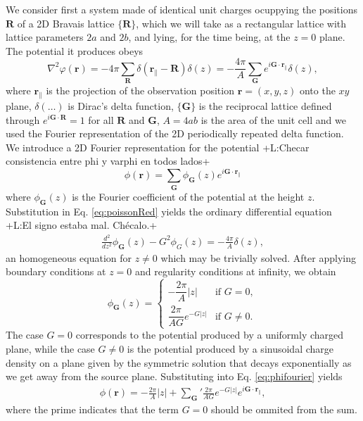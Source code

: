 \documentclass{article}
\newcommand{\abs}[1]{\lvert#1\rvert}
\newcommand{\notaL}[1]{{\color{blue}+L:#1+}}
\begin{document}
We consider first a system made of identical unit charges
ocuppying the positions $\bm R$ of a 2D Bravais lattice $\{\bm R\}$,
which we will take as a rectangular lattice with lattice parameters
$2a$ and $2b$, and lying, for the time being, at the $z=0$ plane.
The potential it produces obeys
\begin{equation}
  \label{eq:poissonRed}
  \nabla^2\varphi(\bm r)=-4\pi\sum_{\bm R}\delta(\bm r_\|-\bm
  R)\delta(z)=-\frac{4\pi}{A}\sum_{\bm G}e^{i\bm G\cdot\bm r_\|}\delta(z),
\end{equation}
where $\bm r_\|$ is the projection of the observation position $\bm
r=(x,y,z)$ onto the $xy$ plane,
$\delta(\ldots)$ is Dirac's delta function, $\{\bm G\}$ is the
reciprocal lattice defined through $e^{i\bm G\cdot\bm R}=1$ for all
$\bm R$ and $\bm G$, $A=4ab$ is the area of the unit cell
and we used the Fourier representation of the 2D
periodically repeated delta function. We introduce a 2D Fourier representation for
the potential \notaL{Checar consistencia entre phi y varphi en todos lados}
\begin{equation}
  \label{eq:phifourier}
  \phi(\bm r)=\sum_{\bm G}\phi_{\bm G}(z)e^{i\bm G\cdot\bm r_\|}
\end{equation}
where $\phi_{\bm G}(z)$ is the Fourier coefficient of the potential at
the height $z$. Substitution in Eq. \eqref{eq:poissonRed} yields the
ordinary differential equation \notaL{El signo estaba mal. Chécalo.}
 \begin{eqnarray}
 \frac{d^2}{dz^2}\phi_{\bm G}(z)-G^2\phi_G(z)=
   -\frac{4 \pi}{A} \delta(z),
 \end{eqnarray}
an homogeneous equation for $z\ne0$ which may be trivially
solved. After applying boundary conditions at $z=0$ and regularity
conditions at infinity, we obtain
\begin{equation}
  \label{eq:phiG}
  \phi_{\bm G}(z)=
  \begin{cases}
    -\dfrac{2\pi}{A}\abs{z}&\text{if }G=0,\\
    \dfrac{2 \pi}{AG}  e^{- G \abs{z}}&\text{if }G\neq 0.
  \end{cases}
\end{equation}
The case $G=0$ corresponds to the potential produced by a uniformly charged plane,
while the case $G\ne 0$ is the potential produced by a sinusoidal
charge density on a plane given by the
symmetric solution that decays exponentially as we get away from
the source plane. Substituting into Eq. \eqref{eq:phifourier} yields
\begin{eqnarray}
  \label{eq:phiG1}
 \phi(\bm r) = -\frac{2 \pi}{A}  \abs{z} +{\sum_{\bm G}}' \frac{2 \pi
   }{AG} e^{- G \abs{z}} e^{i \bm G\cdot\bm r_\|},
 \end{eqnarray}
where the prime indicates that the term $G=0$ should be ommited from
the sum.
\end{document}

